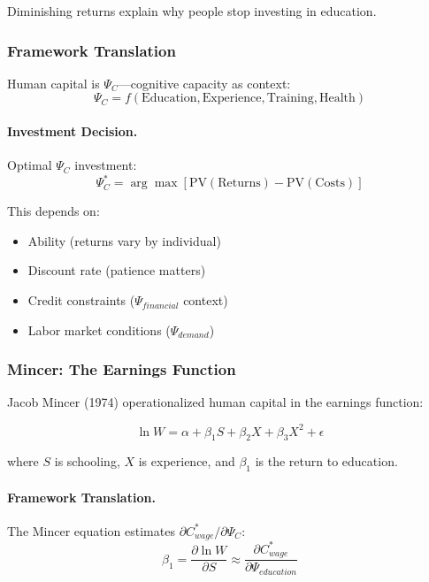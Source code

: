 Diminishing returns explain why people stop investing in education.

\subsubsection{Framework Translation}

Human capital is $\Psi_C$---cognitive capacity as context:
\begin{equation}
\Psi_C = f(\text{Education}, \text{Experience}, \text{Training}, \text{Health})
\end{equation}

\paragraph{Investment Decision.}
Optimal $\Psi_C$ investment:
\begin{equation}
\Psi_C^* = \arg\max \left[ \text{PV}(\text{Returns}) - \text{PV}(\text{Costs}) \right]
\end{equation}

This depends on:
\begin{itemize}
    \item Ability (returns vary by individual)
    \item Discount rate (patience matters)
    \item Credit constraints ($\Psi_{financial}$ context)
    \item Labor market conditions ($\Psi_{demand}$)
\end{itemize}

\subsubsection{Mincer: The Earnings Function}

Jacob Mincer (1974) operationalized human capital in the earnings function:

\begin{equation}
\boxed{
\ln W = \alpha + \beta_1 S + \beta_2 X + \beta_3 X^2 + \epsilon
}
\label{eq:mincer}
\end{equation}

where $S$ is schooling, $X$ is experience, and $\beta_1$ is the return to education.

\paragraph{Framework Translation.}
The Mincer equation estimates $\partial C^*_{wage} / \partial \Psi_C$:
\begin{equation}
\beta_1 = \frac{\partial \ln W}{\partial S} \approx \frac{\partial C^*_{wage}}{\partial \Psi_{education}}
\end{equation}

